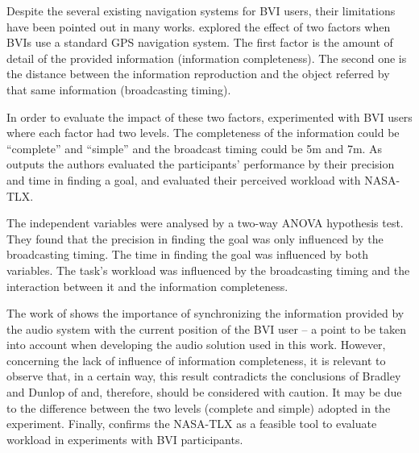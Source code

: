 Despite the several existing navigation systems for BVI users, their limitations have been pointed out in many works.  explored the effect of two factors when BVIs use a standard GPS navigation system. The first factor is the amount of detail of the provided information (information completeness). The second one is the distance between the information reproduction and the object referred by that same information (broadcasting timing).

In order to evaluate the impact of these two factors,  experimented with BVI users where each factor had two levels. The completeness of the information could be “complete” and “simple” and the broadcast timing could be 5m and 7m. As outputs the authors evaluated the participants' performance by their precision and time in finding a goal, and evaluated their perceived workload with NASA-TLX. 

The independent variables were analysed by a two-way ANOVA hypothesis test. They found that the precision in finding the goal was only influenced by the broadcasting timing. The time in finding the goal was influenced by both variables. The task's workload was influenced by the broadcasting timing and the interaction between it and the information completeness.

The work of  shows the importance of synchronizing the information provided by the audio system with the current position of the BVI user – a point to be taken into account when developing the audio solution used in this work. However, concerning the lack of influence of information completeness, it is relevant to observe that, in a certain way, this result contradicts the conclusions of Bradley and Dunlop of \citeyear{bradley2002investigating,bradley2005experimental} and, therefore, should be considered with caution. It may be due to the difference between the two levels (complete and simple) adopted in the experiment. Finally,  confirms the NASA-TLX as a feasible tool to evaluate workload in experiments with BVI participants.
